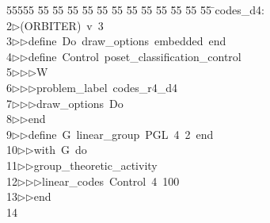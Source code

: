 %
%
\begin{tabbing}
55555 \= 55 \= 55 \= 55 \= 55 \= 55 \= 55 \= 55 \= 55 \= 55 \= 55 \= 55 \= 55 \= \>codes\_d4:\\[0pt]
2\>$\triangleright$\>(ORBITER)\ v\ 3\ \\[0pt]
3\>$\triangleright$\>$\triangleright$\>define\ Do\ draw\_options\ embedded\ end\ \\[0pt]
4\>$\triangleright$\>$\triangleright$\>define\ Control\ poset\_classification\_control\ \\[0pt]
5\>$\triangleright$\>$\triangleright$\>$\triangleright$\>W\ \\[0pt]
6\>$\triangleright$\>$\triangleright$\>$\triangleright$\>problem\_label\ codes\_r4\_d4\ \\[0pt]
7\>$\triangleright$\>$\triangleright$\>$\triangleright$\>draw\_options\ Do\ \\[0pt]
8\>$\triangleright$\>$\triangleright$\>end\ \\[0pt]
9\>$\triangleright$\>$\triangleright$\>define\ G\ linear\_group\ PGL\ 4\ 2\ end\ \\[0pt]
10\>$\triangleright$\>$\triangleright$\>with\ G\ do\ \\[0pt]
11\>$\triangleright$\>$\triangleright$\>group\_theoretic\_activity\ \\[0pt]
12\>$\triangleright$\>$\triangleright$\>$\triangleright$\>linear\_codes\ Control\ 4\ 100\ \\[0pt]
13\>$\triangleright$\>$\triangleright$\>end\\[0pt]
14\>\end{tabbing}
